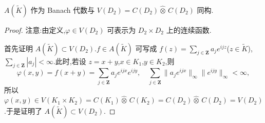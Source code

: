 \begin{proposition}\label{prop:3.4.11}
$A(\widetilde{K})$ 作为 Banach 代数与 $V(D_{2}) = C(D_{2}) \widehat{\otimes}\, C(D_{2})$ 同构.
\end{proposition}

\begin{proof}
注意:由定义,$\varphi \in V(D_{2})$ 可表示为 $D_{2} \times D_{2}$ 上的连续函数.

首先证明 $A(\widetilde{K}) \subset V(D_{2})$.$f \in A(\widetilde{K})$ 可写成 $f(z) = \sum_{j \in \mathbf{Z}} a_{j}e^{ijz}$($z \in \widetilde{K}$),$\sum_{j \in \mathbf{Z}}|a_{j}| < \infty$.此时,若设 $z = x + y$,$x \in K_{1}$,$y \in K_{2}$,则
\begin{equation*}
\varphi(x, y) = f(x + y) = \sum_{j \in \mathbf{Z}}a_{j}e^{ijx}e^{ijy}, \quad \sum_{j \in \mathbf{Z}}\|a_{j}e^{ijx}\|_{\infty}\|e^{ijy}\|_{\infty} < \infty,
\end{equation*}
所以 $\varphi(x, y) \in V(K_{1} \times K_{2}) = C(K_{1}) \widehat{\otimes}\, C(K_{2}) = C(D_{2}) \widehat{\otimes}\, C(D_{2}) = V(D_{2})$.于是证明了 $A(\widetilde{K}) \subset V(D_{2})$.


\end{proof}
